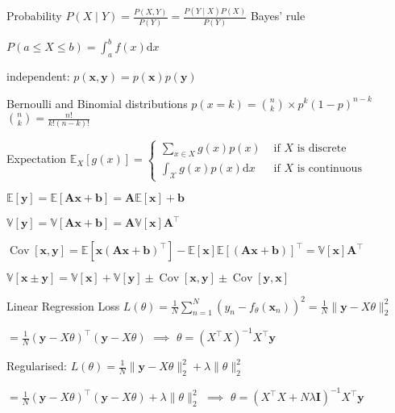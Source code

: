 \documentclass[UTF8,a4paper]{article}
\begin{document}
\begin{multicols}{3}
\begin{cheatsheetblock}{Probability}
    $P(X \mid Y)=\frac{P(X, Y)}{P(Y)}=\frac{P(Y \mid X) P(X)}{P(Y)}$ \hfill Bayes' rule

    $P(a \leq X \leq b)=\int_{a}^{b} f(x) \mathrm{d} x$

    independent: $p(\mathbf{x}, \mathbf{y})=p(\mathbf{x}) p(\mathbf{y})$

\end{cheatsheetblock}

\begin{cheatsheetblock}{Bernoulli and Binomial distributions}
    $p(x=k)= {n \choose k} \times p^k (1-p)^{n-k}$ \hfill ${n \choose k} = \frac{n!}{k!(n-k)!}$
\end{cheatsheetblock}

\begin{cheatsheetblock}{Expectation}
    $\mathbb{E}_X[g(x)]= \begin{cases}\sum_{x \in X} g(x) p(x) & \text { if } X \text { is discrete } \\ \int_\mathscr{X} g(x) p(x) \mathrm{d} x & \text { if } X \text { is continuous }\end{cases}$

    $\mathbb{E}[\bm{y}]=\mathbb{E}[\bm{A x}+\bm{b}]=\bm{A} \mathbb{E}[\bm{x}]+\bm{b}$

    $\mathbb{V}[\bm{y}]=\mathbb{V}[\bm{A} \bm{x}+\bm{b}]=\bm{A} \mathbb{V}[\bm{x}] \bm{A}^{\top}$

    $\operatorname{Cov}[\bm{x}, \bm{y}]=\mathbb{E}\left[\bm{x}(\bm{A} \bm{x}+\bm{b})^{\top}\right]-\mathbb{E}[\bm{x}] \mathbb{E}[(\bm{A} \bm{x}+\bm{b})]^{\top}=\mathbb{V}[\bm{x}] \bm{A}^{\top}$

    $\mathbb{V}[\mathbf{x} \pm \mathbf{y}]=\mathbb{V}[\mathbf{x}]+\mathbb{V}[\mathbf{y}] \pm \operatorname{Cov}[\mathbf{x}, \mathbf{y}] \pm \operatorname{Cov}[\mathbf{y}, \mathbf{x}]$
\end{cheatsheetblock}

\begin{cheatsheetblock}{Linear Regression}
    Loss \hfill $L(\theta)=\frac{1}{N} \sum_{n=1}^N\left(y_n-f_\theta\left(\mathbf{x}_n\right)\right)^2=\frac{1}{N}\|\mathbf{y}-X \theta\|_2^2$

    $=\frac{1}{N}(\mathbf{y}-X \theta)^{\top}(\mathbf{y}-X \theta)$ \hfill $\implies$ \hfill $\theta=\left(X^{\top} X\right)^{-1} X^{\top} \mathbf{y}$

    Regularised: \hfill $L(\theta)=\frac{1}{N}\|\mathbf{y}-X \theta\|_2^2+\lambda\|\theta\|_2^2$

    $=\frac{1}{N}(\mathbf{y}-X \theta)^{\top}(\mathbf{y}-X \theta)+\lambda\|\theta\|_2^2$ \hfill $\implies$ \hfill $\theta=\left(X^{\top} X+N \lambda \mathbf{I}\right)^{-1} X^{\top} \mathbf{y}$


\end{cheatsheetblock}
\end{multicols}
\end{document}
